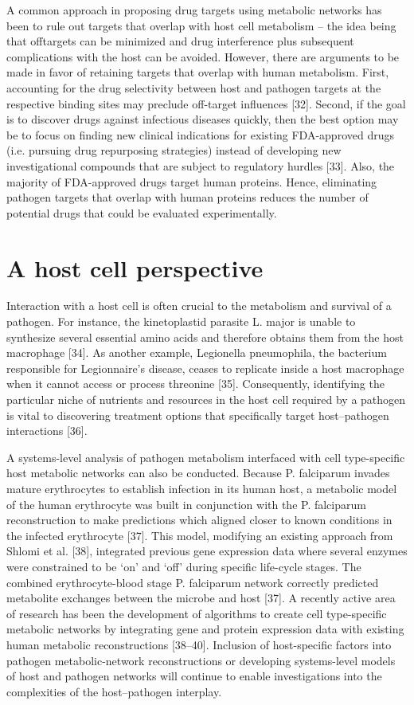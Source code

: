 A common approach in proposing drug targets using metabolic 
networks has been to rule out targets that overlap with host 
cell metabolism – the idea being that offtargets can be minimized 
and drug interference plus subsequent complications with the host 
can be avoided. However, there are arguments to be made in favor 
of retaining targets that overlap with human metabolism. First, 
accounting for the drug selectivity between host and pathogen 
targets at the respective binding sites may preclude off-target 
influences [32]. Second, if the goal is to discover drugs against 
infectious diseases quickly, then the best option may be to 
focus on finding new clinical indications for existing FDA-approved 
drugs (i.e. pursuing drug repurposing strategies) instead of 
developing new investigational compounds that are subject to 
regulatory hurdles [33]. Also, the majority of FDA-approved 
drugs target human proteins. Hence, eliminating pathogen 
targets that overlap with human proteins reduces the number 
of potential drugs that could be evaluated experimentally.

\section{A host cell perspective}
Interaction with a host cell is often crucial to the metabolism 
and survival of a pathogen. For instance, the kinetoplastid 
parasite L. major is unable to synthesize several essential 
amino acids and therefore obtains them from the host macrophage [34]. 
As another example, Legionella pneumophila, the bacterium 
responsible for Legionnaire’s disease, ceases to replicate 
inside a host macrophage when it cannot access or process 
threonine [35]. Consequently, identifying the particular 
niche of nutrients and resources in the host cell required 
by a pathogen is vital to discovering treatment options 
that specifically target host–pathogen interactions [36].

A systems-level analysis of pathogen metabolism interfaced 
with cell type-specific host metabolic networks can also 
be conducted. Because P. falciparum invades mature erythrocytes 
to establish infection in its human host, a metabolic model 
of the human erythrocyte was built in conjunction with the 
P. falciparum reconstruction to make predictions which aligned 
closer to known conditions in the infected erythrocyte [37]. 
This model, modifying an existing approach from Shlomi et al. [38], 
integrated previous gene expression data where several enzymes 
were constrained to be ‘on’ and ‘off’ during specific life-cycle 
stages. The combined erythrocyte-blood stage P. falciparum 
network correctly predicted metabolite exchanges between the 
microbe and host [37]. A recently active area of research has 
been the development of algorithms to create cell type-specific 
metabolic networks by integrating gene and protein expression 
data with existing human metabolic reconstructions [38–40]. Inclusion 
of host-specific factors into pathogen metabolic-network 
reconstructions or developing systems-level models of host and 
pathogen networks will continue to enable investigations into 
the complexities of the host–pathogen interplay.

